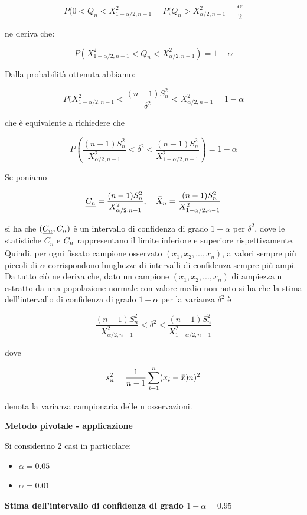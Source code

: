 \[P(0<Q_n<X^2_{1-\alpha/2,n-1} = P(Q_n>X^2_{\alpha/2,n-1} = \frac{\alpha}{2}\]

ne deriva che:

\[P(X^2_{1-\alpha/2,n-1} < Q_n < X^2_{\alpha/2,n-1}) = 1-\alpha\]

Dalla probabilità ottenuta abbiamo:

\[P(X^2_{1-\alpha/2,n-1} < \frac{(n-1)S_n^2}{\delta^2}<X^2_{\alpha/2,n-1} = 1-\alpha\]

che è equivalente a richiedere che 

\[P(\frac{(n-1)S_n^2}{X^2_{\alpha/2,n-1}} < \delta^2 < \frac{(n-1)S^2_n}{X^2_{1-\alpha/2,n-1}}) = 1-\alpha\]

Se poniamo

\[\underline{C_n} = \frac{(n-1)S_n^2}{X^2_{\alpha/2,n-1}}, \quad \Bar{X}_n = \frac{(n-1)S^2_n}{X^2_{1-\alpha/2,n-1}}\]

si ha che $(\underline{C_n}, \Bar{C}_n)$ è un intervallo di confidenza di grado $1-\alpha$ per $\delta^2$, dove le statistiche $\underline{C_n}$ e $\Bar{C}_n$ rappresentano il limite inferiore e superiore rispettivamente. Quindi, per ogni fissato campione osservato $(x_1, x_2, ..., x_n)$, a valori sempre più piccoli di $\alpha$ corrispondono lunghezze di intervalli di confidenza sempre più ampi. Da tutto ciò ne deriva che, dato un campione $(x_1, x_2, ..., x_n)$ di ampiezza n estratto da una popolazione normale con valore medio non noto si ha che la stima dell'intervallo di confidenza di grado $1-\alpha$ per la  varianza $\delta^2$ è

\[\frac{(n-1)S_n^2}{X^2_{\alpha/2,n-1}} < \delta^2 < \frac{(n-1)S^2_n}{X^2_{1-\alpha/2,n-1}}\]

dove

\[s_n^2 = \frac{1}{n-1} \sum_{i+1}^n (x_i - \Bar{x})n)^2\]

denota la varianza campionaria delle n osservazioni.

\vspace{5mm}
\noindent \textbf{Metodo pivotale - applicazione}

Si considerino 2 casi in particolare:

\begin{itemize}
    \item $\alpha = 0.05$
    \item $\alpha = 0.01$
\end{itemize}

\vspace{5mm}
\noindent \textbf{Stima dell'intervallo di confidenza di grado $1 - \alpha = 0.95$}

